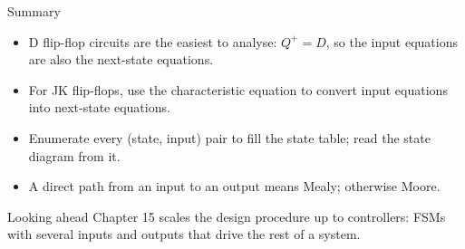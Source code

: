 \documentclass[9pt,aspectratio=169,xcolor=table]{beamer}
\begin{document}
\begin{frame}{Summary}
  \begin{itemize}\itemsep3pt\small
    \item D flip-flop circuits are the easiest to analyse: $Q^+ = D$, so the input equations are also the next-state equations.
    \item For JK flip-flops, use the characteristic equation to convert input equations into next-state equations.
    \item Enumerate every (state, input) pair to fill the state table; read the state diagram from it.
    \item A direct path from an input to an output means Mealy; otherwise Moore.
  \end{itemize}
  \begin{block}{Looking ahead}
    Chapter 15 scales the design procedure up to controllers: FSMs with several inputs and outputs that drive the rest of a system.
  \end{block}
\end{frame}
\end{document}
